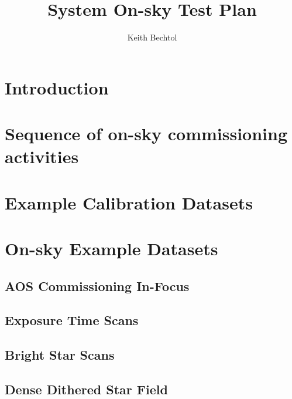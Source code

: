 \documentclass[SE,authoryear,toc]{lsstdoc}
\title{System On-sky Test Plan}
\author{%
Keith Bechtol
}
\date{\vcsDate}
\begin{document}
\maketitle


\section{Introduction}

\section{Sequence of on-sky commissioning activities}

\section{Example Calibration Datasets}

\section{On-sky Example Datasets}

\subsection{AOS Commissioning In-Focus}

%

\subsection{Exposure Time Scans}

%

\subsection{Bright Star Scans}

%

\subsection{Dense Dithered Star Field}
\end{document}
